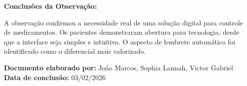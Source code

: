 \documentclass[12pt]{article}
\begin{document}
\textbf{Conclusões da Observação:}

A observação confirmou a necessidade real de uma solução digital para controle de medicamentos. Os pacientes demonstraram abertura para tecnologia, desde que a interface seja simples e intuitiva. O aspecto de lembrete automático foi identificado como o diferencial mais valorizado.


\vspace{2cm}

\begin{center}
\textbf{Documento elaborado por:} João Marcos, Sophia Lannah, Victor Gabriel \\
\textbf{Data de conclusão:} 03/02/2026
\end{center}
\end{document}
